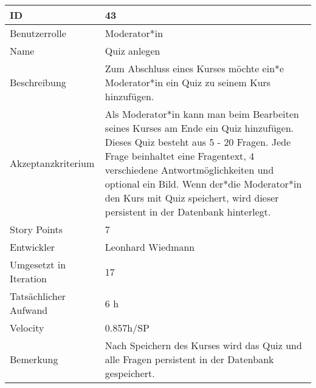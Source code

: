 \begin{tabularx}{\textwidth}{|p{}|X|}
	\hline
	ID & 43\\
	\hline
	Benutzerrolle & Moderator*in\\
	\hline
	Name & Quiz anlegen\\
	\hline
	Beschreibung & Zum Abschluss eines Kurses möchte ein*e Moderator*in ein Quiz zu seinem Kurs hinzufügen. \\
	\hline
	Akzeptanzkriterium & Als Moderator*in kann man beim Bearbeiten seines Kurses am Ende ein Quiz hinzufügen. Dieses Quiz besteht aus 5 - 20 Fragen. Jede Frage beinhaltet eine Fragentext, 4 verschiedene Antwortmöglichkeiten und optional ein Bild. Wenn der*die Moderator*in den Kurs mit Quiz speichert, wird dieser persistent in der Datenbank hinterlegt.\\
	\hline
	Story Points & 7\\
	\hline
	Entwickler & Leonhard Wiedmann\\
	\hline
	Umgesetzt in Iteration & 17\\
	\hline
	Tatsächlicher Aufwand & 6 h\\
	\hline
	Velocity & 0.857h/SP \\
	\hline
	Bemerkung & Nach Speichern des Kurses wird das Quiz und alle Fragen persistent in der Datenbank gespeichert.\\
	\hline
\end{tabularx}
\vspace{20pt}
